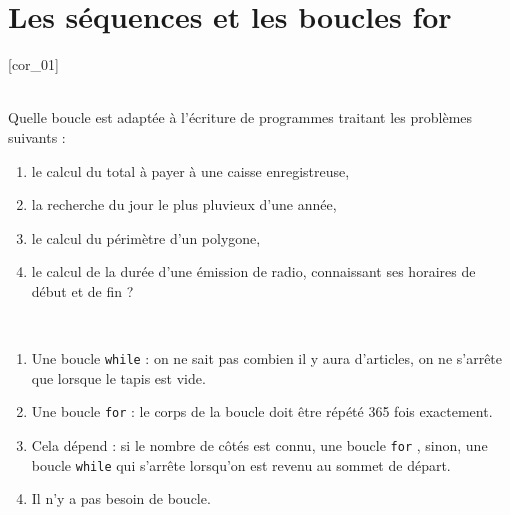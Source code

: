 \documentclass[a4paper,12pt]{article}
\newcommand{\numero}{10}                                    %
\begin{document}


\setcounter{section}{\numero}
\section{Les séquences et les boucles for}				
[cor_01]

  ~\\ 
Quelle boucle est adaptée à l’écriture de programmes traitant les problèmes suivants :
\begin{enumerate}
	\item le calcul du total à payer à une caisse enregistreuse,
	\item la recherche du jour le plus pluvieux d’une année,
	\item le calcul du périmètre d’un polygone,
	\item le calcul de la durée d’une émission de radio, connaissant ses horaires de début et de fin ?
\end{enumerate}
\begin{correction}
	~\\ 
	\begin{enumerate}
		\item   Une boucle \lstinline!while! : on ne sait pas combien il y aura d’articles, on ne s’arrête que lorsque le tapis est vide.
		\item Une boucle \lstinline!for! : le corps de la boucle doit être répété 365 fois exactement.
		\item Cela dépend : si le nombre de côtés est connu, une boucle \lstinline!for! , sinon, une boucle \lstinline!while! qui s’arrête lorsqu’on est revenu au sommet de départ.
		\item Il n’y a pas besoin de boucle.
	\end{enumerate}
\end{correction}
\finexo
\end{document}
